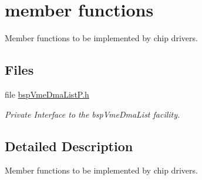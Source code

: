 \hypertarget{group__shared__bspvmedmalistp}{}\section{member functions}
\label{group__shared__bspvmedmalistp}


Member functions to be implemented by chip drivers.  


\subsection*{Files}
\begin{DoxyCompactItemize}
\item 
file \mbox{\hyperlink{bspVmeDmaListP_8h}{bsp\+Vme\+Dma\+List\+P.\+h}}
\begin{DoxyCompactList}\small\item\em Private Interface to the bsp\+Vme\+Dma\+List facility. \end{DoxyCompactList}\end{DoxyCompactItemize}


\subsection{Detailed Description}
Member functions to be implemented by chip drivers. 

